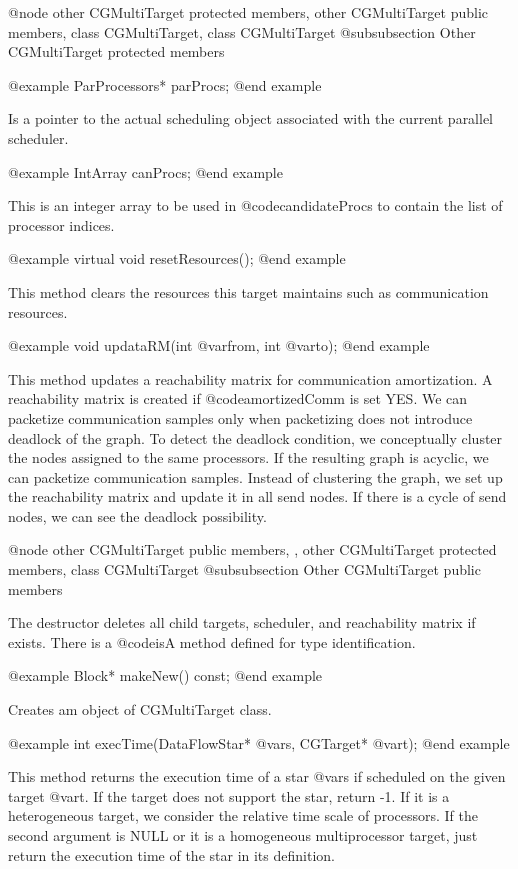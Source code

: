 @node other CGMultiTarget protected members, other CGMultiTarget public members, class CGMultiTarget, class CGMultiTarget
@subsubsection Other CGMultiTarget protected members

@example
ParProcessors* parProcs;
@end example

Is a pointer to the actual scheduling object associated with the current
parallel scheduler.

@example
IntArray canProcs;
@end example

This is an integer array to be used in @code{candidateProcs} to contain
the list of processor indices.

@example
virtual void resetResources();
@end example

This method clears the resources this target maintains such as communication
resources.

@example
void updataRM(int @var{from}, int @var{to});
@end example

This method updates a reachability matrix for communication amortization.
A reachability matrix is created if @code{amortizedComm} is set YES.
We can packetize communication samples only when packetizing does not
introduce deadlock of the graph. To detect the deadlock condition, we
conceptually cluster the nodes assigned to the same processors. If the
resulting graph is acyclic, we can packetize communication samples.
Instead of clustering the graph, we set up the reachability matrix and
update it in all send nodes. If there is a cycle of send nodes, we can
see the deadlock possibility.

@node other CGMultiTarget public members, , other CGMultiTarget protected members, class CGMultiTarget
@subsubsection Other CGMultiTarget public members

The destructor deletes all child targets, scheduler, and reachability matrix
if exists. There is a @code{isA} method defined for type identification.

@example
Block* makeNew() const;
@end example

Creates am object of CGMultiTarget class.

@example
int execTime(DataFlowStar* @var{s}, CGTarget* @var{t});
@end example

This method returns the execution time of a star @var{s} if scheduled on
the given target @var{t}. If the target does not support the star, return -1.
If it is a heterogeneous target, we consider the relative time scale of
processors. If the second argument is NULL or it is a homogeneous 
multiprocessor target, just return the execution time of the star in its
definition.


